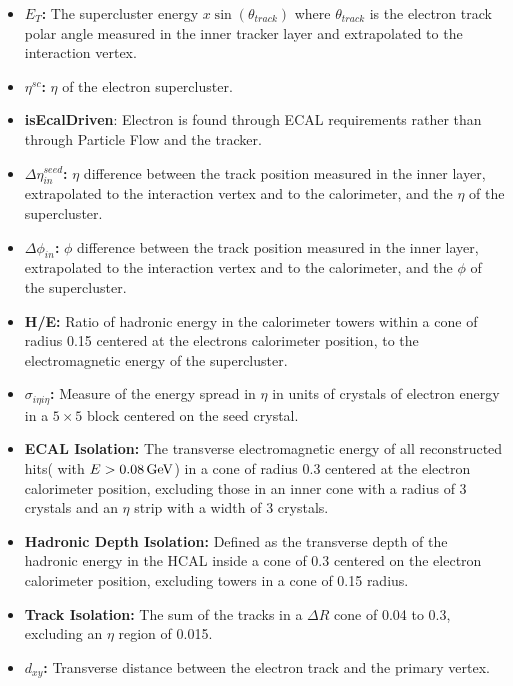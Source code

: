 \begin{itemize}
\itemsep-1em 
\item \textbf{$E_T$:} The supercluster energy $x \sin(\theta_{track})$ where $\theta_{track}$ is the electron track polar angle measured in the inner tracker layer and extrapolated to the interaction vertex. \newline
\item \textbf{$\eta^{sc}$:} $\eta$ of the electron supercluster.\newline
\item \textbf{isEcalDriven}: Electron is found through ECAL requirements rather than through Particle Flow and the tracker.\newline
\item \textbf{$\Delta \eta_{in}^{seed}$:} $\eta$ difference between the track position measured in the inner layer, extrapolated to the interaction vertex and to the calorimeter, and the $\eta$ of the supercluster. \newline
\item \textbf{$\Delta\phi_{in}$:}  $\phi$ difference between the track position measured in the inner layer, extrapolated to the interaction vertex and to the calorimeter, and the $\phi$ of the supercluster. \newline
\item \textbf{H/E:} Ratio of hadronic energy in the calorimeter towers within a cone of radius 0.15 centered at the electrons calorimeter position, to the electromagnetic energy of the supercluster.\newline
\item \textbf{$\sigma_{i \eta i \eta}$:} Measure of the energy spread in $\eta$ in units of crystals of electron energy in a $5 \times 5$ block centered on the seed crystal.\newline
\item \textbf{ECAL Isolation:} The transverse electromagnetic energy of all reconstructed hits( with $E > 0.08 \,\text{Ge\hspace{-.08em}V}$) in a cone of radius 0.3 centered at the electron calorimeter position, excluding those in an inner cone with a radius of 3 crystals and an $\eta$ strip with a width of 3 crystals.\newline
\item \textbf{Hadronic Depth Isolation:} Defined as the transverse depth of the hadronic energy in the HCAL inside a cone of 0.3 centered on the electron calorimeter position, excluding towers in a cone of 0.15 radius.\newline
\item \textbf{Track \PT Isolation:} The sum \PT of the tracks in a $\Delta R$ cone of 0.04 to 0.3, excluding an $\eta$ region of 0.015.\newline
\item \textbf{$d_{xy}$:} Transverse distance between the electron track and the primary vertex.\newline
\end{itemize}

